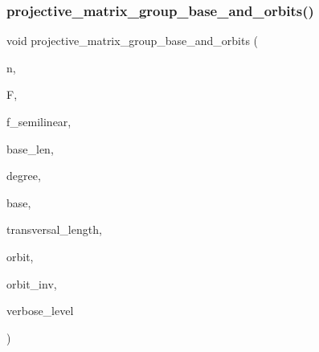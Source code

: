 \subsubsection{\texorpdfstring{projective\+\_\+matrix\+\_\+group\+\_\+base\+\_\+and\+\_\+orbits()}{projective\_matrix\_group\_base\_and\_orbits()}}
{\footnotesize\ttfamily void projective\+\_\+matrix\+\_\+group\+\_\+base\+\_\+and\+\_\+orbits (\begin{DoxyParamCaption}\item[{\mbox{\hyperlink{galois_8h_a09fddde158a3a20bd2dcadb609de11dc}{I\+NT}}}]{n,  }\item[{\mbox{\hyperlink{classfinite__field}{finite\+\_\+field}} $\ast$}]{F,  }\item[{\mbox{\hyperlink{galois_8h_a09fddde158a3a20bd2dcadb609de11dc}{I\+NT}}}]{f\+\_\+semilinear,  }\item[{\mbox{\hyperlink{galois_8h_a09fddde158a3a20bd2dcadb609de11dc}{I\+NT}}}]{base\+\_\+len,  }\item[{\mbox{\hyperlink{galois_8h_a09fddde158a3a20bd2dcadb609de11dc}{I\+NT}}}]{degree,  }\item[{\mbox{\hyperlink{galois_8h_a09fddde158a3a20bd2dcadb609de11dc}{I\+NT}} $\ast$}]{base,  }\item[{\mbox{\hyperlink{galois_8h_a09fddde158a3a20bd2dcadb609de11dc}{I\+NT}} $\ast$}]{transversal\+\_\+length,  }\item[{\mbox{\hyperlink{galois_8h_a09fddde158a3a20bd2dcadb609de11dc}{I\+NT}} $\ast$$\ast$}]{orbit,  }\item[{\mbox{\hyperlink{galois_8h_a09fddde158a3a20bd2dcadb609de11dc}{I\+NT}} $\ast$$\ast$}]{orbit\+\_\+inv,  }\item[{\mbox{\hyperlink{galois_8h_a09fddde158a3a20bd2dcadb609de11dc}{I\+NT}}}]{verbose\+\_\+level }\end{DoxyParamCaption})}

\mbox{\label{group__generators_8_c_ac54b6b358072e2da0d43750d40fb2837}} 
